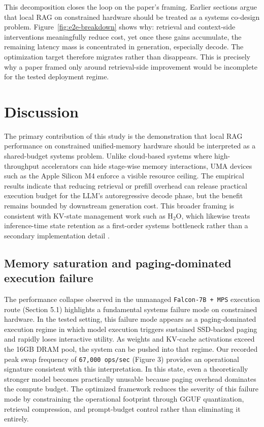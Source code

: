 \documentclass[10pt,twocolumn]{article}
\begin{document}
This decomposition closes the loop on the paper's framing. Earlier sections argue that local RAG on constrained hardware should be treated as a systems co-design problem. Figure~\ref{fig:e2e-breakdown} shows why: retrieval and context-side interventions meaningfully reduce cost, yet once these gains accumulate, the remaining latency mass is concentrated in generation, especially decode. The optimization target therefore migrates rather than disappears. This is precisely why a paper framed only around retrieval-side improvement would be incomplete for the tested deployment regime.

\section{Discussion}

The primary contribution of this study is the demonstration that local RAG performance on constrained unified-memory hardware should be interpreted as a shared-budget systems problem. Unlike cloud-based systems where high-throughput accelerators can hide stage-wise memory interactions, UMA devices such as the Apple Silicon M4 enforce a visible resource ceiling. The empirical results indicate that reducing retrieval or prefill overhead can release practical execution budget for the LLM's autoregressive decode phase, but the benefit remains bounded by downstream generation cost. This broader framing is consistent with KV-state management work such as H$_2$O, which likewise treats inference-time state retention as a first-order systems bottleneck rather than a secondary implementation detail \cite{zhang2023h2o}.

\subsection{Memory saturation and paging-dominated execution failure}

The performance collapse observed in the unmanaged \texttt{Falcon-7B + MPS} execution route (Section 5.1) highlights a fundamental systems failure mode on constrained hardware. In the tested setting, this failure mode appears as a paging-dominated execution regime in which model execution triggers sustained SSD-backed paging and rapidly loses interactive utility. As weights and KV-cache activations exceed the 16GB DRAM pool, the system can be pushed into that regime. Our recorded peak swap frequency of \texttt{67,000 ops/sec} (Figure 3) provides an operational signature consistent with this interpretation. In this state, even a theoretically stronger model becomes practically unusable because paging overhead dominates the compute budget. The optimized framework reduces the severity of this failure mode by constraining the operational footprint through GGUF quantization, retrieval compression, and prompt-budget control rather than eliminating it entirely.
\end{document}
